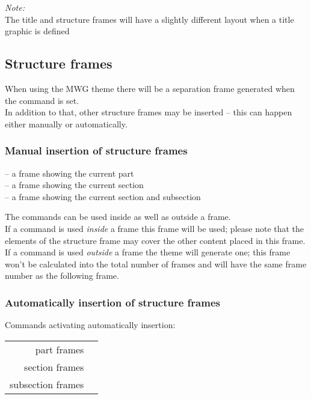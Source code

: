 \documentclass[11pt]{ltxdoc}
\begin{document}
	\smallskip
	\textit{Note:} \\
	The title and structure frames will have a slightly different layout when a title graphic is defined
	
	
	\subsection{Structure frames}
	When using the MWG theme there will be a separation frame generated when the \texttt{\appendix} command is set. \\
	In addition to that, other structure frames may be inserted -- this can happen either manually or automatically.
	
	\subsubsection*{Manual insertion of structure frames}
	\texttt{\partframe} -- a frame showing the current part \\
	\texttt{\sectionframe} -- a frame showing the current section \\
	\texttt{\subsectionframe} -- a frame showing the current section and subsection
	
	\medskip
	The commands can be used inside as well as outside a frame. \\
	If a command is used \textit{inside} a frame this frame will be used; please note that the elements of the structure frame may cover the other content placed in this frame. \\
	If a command is used \textit{outside} a frame the theme will generate one; this frame won't be calculated into the total number of frames and will have the same frame number as the following frame.
	
	
	\subsubsection*{Automatically insertion of structure frames}
	Commands activating automatically insertion: \\[\smallskipamount]\nopagebreak
	\begin{tabular}{rl}
		part frames & \texttt{\activatepartframes} \\
		section frames & \texttt{\activatesectionframes} \\
		subsection frames & \texttt{\activatesubsectionframes}
	\end{tabular}
	
\end{document}
